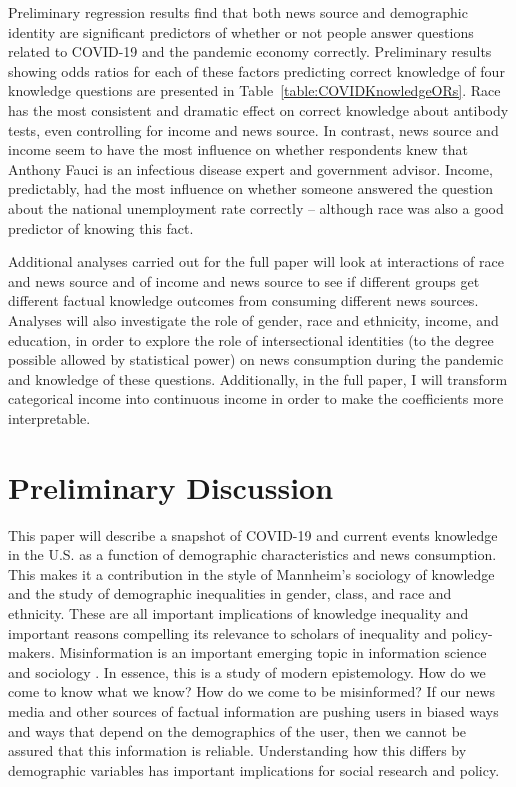 \documentclass[11pt]{article}
\begin{document}
Preliminary regression results find that both news source and demographic identity are significant predictors of whether or not people
answer questions related to COVID-19 and the pandemic economy correctly. Preliminary results showing odds ratios for each of these factors predicting correct knowledge of four knowledge questions are presented in Table~\ref{table:COVIDKnowledgeORs}. Race has the most consistent and dramatic effect on correct knowledge about antibody tests, even controlling for income and news source. In contrast, news source and income seem to have the most influence on whether respondents knew that Anthony Fauci is an infectious disease expert and government advisor. Income, predictably, had the most influence on whether someone answered the question about the national unemployment rate correctly -- although race was also a good predictor of knowing this fact.

Additional analyses carried out for the full paper will look at interactions of race and news source and of income and news source to see if different groups get different factual knowledge outcomes from consuming different news sources. Analyses will also investigate the role of gender, race and ethnicity, income, and education, in order to explore the role of intersectional identities (to the degree possible allowed by statistical power) on news consumption during the pandemic and knowledge of these questions. Additionally, in the full paper, I will transform categorical income into continuous income in order to make the coefficients more interpretable.


\hypertarget{discussion}{%
\section{Preliminary Discussion}\label{sec:discussion}}


This paper will describe a snapshot of COVID-19 and current events knowledge in
the U.S. as a function of demographic characteristics and news consumption. This
makes it a contribution in the style of Mannheim's sociology of knowledge
\citep{Mannheim, Swidler1994} and the study of demographic inequalities in
gender, class, and race and ethnicity. These are all important implications of
knowledge inequality and important reasons compelling its relevance to scholars
of inequality and policy-makers. Misinformation is an important emerging topic
in information science and sociology \citep{Metaxa-Kakavouli2017}. In essence,
this is a study of modern epistemology. How do we come to know what we know? How
do we come to be misinformed? If our news media and other sources of factual
information are pushing users in biased ways and ways that depend on the
demographics of the user, then we cannot be assured that this information is
reliable. Understanding how this differs by demographic variables has important
implications for social research and policy.
\end{document}

